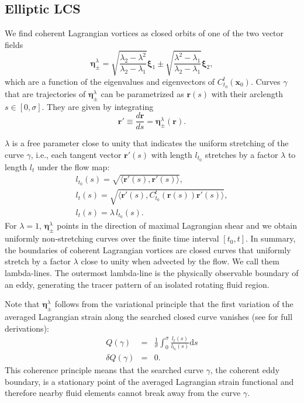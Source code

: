 \documentclass{article}
\begin{document}
\subsection{Elliptic LCS}
We find coherent Lagrangian vortices as closed orbits of one of the two vector fields
\begin{equation}
\boldsymbol \eta^{\lambda}_\pm = \sqrt{\frac{\lambda_2 - \lambda^2}{\lambda_2 - \lambda_1}} \boldsymbol \xi_1 \pm \sqrt{\frac{\lambda^2 - \lambda_1}{\lambda_2 - \lambda_1}} \boldsymbol \xi_2,
\label{eq:eta}
\end{equation}
which are a function of the eigenvalues and eigenvectors of $C_{t_0}^t(\boldsymbol x_0)$. Curves $\gamma$ that are trajectories of $\boldsymbol \eta^{\lambda}_\pm$ can be parametrized as $\boldsymbol r(s)$ with their arclength $s \in [0,\sigma]$. They are given by integrating
\begin{equation}
\boldsymbol r' \equiv \frac{d \boldsymbol r}{ds} = \boldsymbol \eta^{\lambda}_\pm(\boldsymbol r).
\label{eq:etafields}
\end{equation}

$\lambda$ is a free parameter close to unity that indicates the uniform stretching of the curve $\gamma$, i.e., each tangent vector $\boldsymbol r'(s)$ with length $l_{t_0}$ stretches by a factor $\lambda$ to length $l_{t}$ under the flow map:
\begin{gather*}
l_{t_0}(s) = \sqrt{\langle \boldsymbol r'(s), \boldsymbol r'(s) \rangle},\\
l_t(s) = \sqrt{\langle \boldsymbol r'(s), C_{t_0}^t(\boldsymbol r(s)) \boldsymbol r'(s) \rangle},\\
l_t(s) = \lambda\, l_{t_0}(s).
\end{gather*}
For $\lambda=1$, $\boldsymbol \eta^{\lambda}_\pm$ points in the direction of maximal Lagrangian shear and we obtain uniformly non-stretching curves over the finite time interval $[t_0, t]$. In summary, the boundaries of coherent Lagrangian vortices are closed curves that uniformly stretch by a factor $\lambda$ close to unity when advected by the flow. We call them lambda-lines. The outermost lambda-line is the physically observable boundary of an eddy, generating the tracer pattern of an isolated rotating fluid region.

Note that $\boldsymbol \eta^{\lambda}_\pm$ follows from the variational principle that the first variation of the averaged Lagrangian strain along the searched closed curve vanishes (see \parencite{haller13:_coher_lagran} for full derivations):
\begin{eqnarray*}
Q(\gamma) &=& \frac{1}{\sigma} \int_0^\sigma \frac{l_t(s)}{l_{t_0}(s)}\text{d}s\\
\delta Q(\gamma) &=& 0.
\end{eqnarray*}
This coherence principle means that the searched curve $\gamma$, the coherent eddy boundary, is a stationary point of the averaged Lagrangian strain functional and therefore nearby fluid elements cannot break away from the curve $\gamma$.
\end{document}
